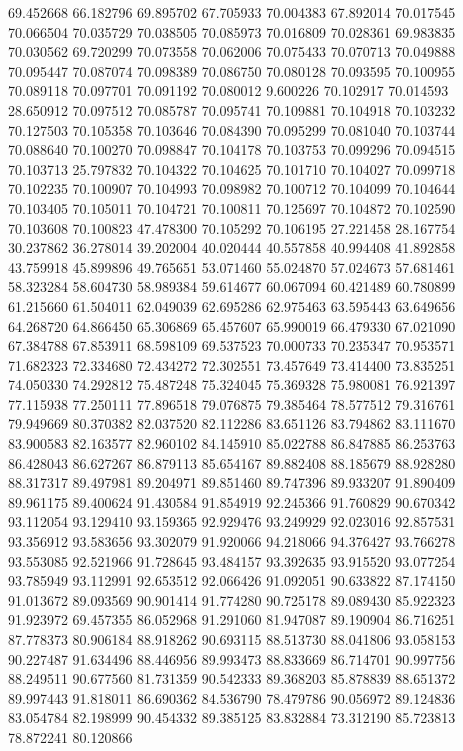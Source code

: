 69.452668
66.182796
69.895702
67.705933
70.004383
67.892014
70.017545
70.066504
70.035729
70.038505
70.085973
70.016809
70.028361
69.983835
70.030562
69.720299
70.073558
70.062006
70.075433
70.070713
70.049888
70.095447
70.087074
70.098389
70.086750
70.080128
70.093595
70.100955
70.089118
70.097701
70.091192
70.080012
9.600226
70.102917
70.014593
28.650912
70.097512
70.085787
70.095741
70.109881
70.104918
70.103232
70.127503
70.105358
70.103646
70.084390
70.095299
70.081040
70.103744
70.088640
70.100270
70.098847
70.104178
70.103753
70.099296
70.094515
70.103713
25.797832
70.104322
70.104625
70.101710
70.104027
70.099718
70.102235
70.100907
70.104993
70.098982
70.100712
70.104099
70.104644
70.103405
70.105011
70.104721
70.100811
70.125697
70.104872
70.102590
70.103608
70.100823
47.478300
70.105292
70.106195
27.221458
28.167754
30.237862
36.278014
39.202004
40.020444
40.557858
40.994408
41.892858
43.759918
45.899896
49.765651
53.071460
55.024870
57.024673
57.681461
58.323284
58.604730
58.989384
59.614677
60.067094
60.421489
60.780899
61.215660
61.504011
62.049039
62.695286
62.975463
63.595443
63.649656
64.268720
64.866450
65.306869
65.457607
65.990019
66.479330
67.021090
67.384788
67.853911
68.598109
69.537523
70.000733
70.235347
70.953571
71.682323
72.334680
72.434272
72.302551
73.457649
73.414400
73.835251
74.050330
74.292812
75.487248
75.324045
75.369328
75.980081
76.921397
77.115938
77.250111
77.896518
79.076875
79.385464
78.577512
79.316761
79.949669
80.370382
82.037520
82.112286
83.651126
83.794862
83.111670
83.900583
82.163577
82.960102
84.145910
85.022788
86.847885
86.253763
86.428043
86.627267
86.879113
85.654167
89.882408
88.185679
88.928280
88.317317
89.497981
89.204971
89.851460
89.747396
89.933207
91.890409
89.961175
89.400624
91.430584
91.854919
92.245366
91.760829
90.670342
93.112054
93.129410
93.159365
92.929476
93.249929
92.023016
92.857531
93.356912
93.583656
93.302079
91.920066
94.218066
94.376427
93.766278
93.553085
92.521966
91.728645
93.484157
93.392635
93.915520
93.077254
93.785949
93.112991
92.653512
92.066426
91.092051
90.633822
87.174150
91.013672
89.093569
90.901414
91.774280
90.725178
89.089430
85.922323
91.923972
69.457355
86.052968
91.291060
81.947087
89.190904
86.716251
87.778373
80.906184
88.918262
90.693115
88.513730
88.041806
93.058153
90.227487
91.634496
88.446956
89.993473
88.833669
86.714701
90.997756
88.249511
90.677560
81.731359
90.542333
89.368203
85.878839
88.651372
89.997443
91.818011
86.690362
84.536790
78.479786
90.056972
89.124836
83.054784
82.198999
90.454332
89.385125
83.832884
73.312190
85.723813
78.872241
80.120866
